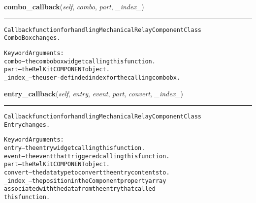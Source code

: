    \vspace{0.5ex}

\hspace{.8\funcindent}\begin{boxedminipage}{\funcwidth}

    \raggedright \textbf{combo\_callback}(\textit{self}, \textit{combo}, \textit{part}, \textit{\_index\_})

    \vspace{-1.5ex}

    \rule{\textwidth}{0.5\fboxrule}
\setlength{\parskip}{2ex}
\begin{alltt}
Callback function for handling Mechanical Relay Component Class
ComboBox changes.

Keyword Arguments:
  combo -- the combobox widget calling this function.
   part -- the RelKit COMPONENT object.
\_index\_ -- the user-definded index for the calling combobx.
\end{alltt}

\setlength{\parskip}{1ex}
    \end{boxedminipage}

    \label{reliafree:relays:relay:Mechanical:entry_callback}

    \vspace{0.5ex}

\hspace{.8\funcindent}\begin{boxedminipage}{\funcwidth}

    \raggedright \textbf{entry\_callback}(\textit{self}, \textit{entry}, \textit{event}, \textit{part}, \textit{convert}, \textit{\_index\_})

    \vspace{-1.5ex}

    \rule{\textwidth}{0.5\fboxrule}
\setlength{\parskip}{2ex}
\begin{alltt}
Callback function for handling Mechanical Relay Component Class
Entry changes.

Keyword Arguments:
  entry -- the entry widget calling this function.
  event -- the event that triggered calling this function.
   part -- the RelKit COMPONENT object.
convert -- the data type to convert the entry contents to.
\_index\_ -- the position in the Component property array
           associated with the data from the entry that called
           this function.
\end{alltt}

\setlength{\parskip}{1ex}
    \end{boxedminipage}

